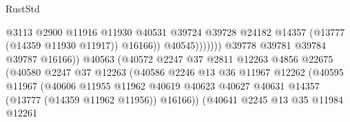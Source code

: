 \begin{lexlean}{RustStd}
\begin{coremodule}
                                                      @3113
                                                      @2900
                                                      @11916
                                                      @11930
                                                      @40531
                                                      @39724
                                                      @39728
                                                      @24182
                                                      @14357
                                                      (@13777 (@14359 @11930 @11917))
                                                      @16166))
                                                  @40545)))))))
                                    @39778
                                    @39781
                                    @39784
                                    @39787
                                    @16166))
                                @40563
                                (@40572
                                  @2247
                                  @37
                                  @2811
                                  @12263
                                  @4856
                                  @22675
                                  (@40580
                                    @2247
                                    @37
                                    @12263
                                    (@40586
                                      @2246
                                      @13
                                      @36
                                      @11967
                                      @12262
                                      (@40595
                                        @11967
                                        (@40606
                                          @11955
                                          @11962
                                          @40619
                                          @40623
                                          @40627
                                          @40631
                                          @14357
                                          (@13777 (@14359 @11962 @11956))
                                          @16166))
                                      (@40641
                                        @2245
                                        @13
                                        @35
                                        @11984
                                        @12261

\end{coremodule}
\end{lexlean}
